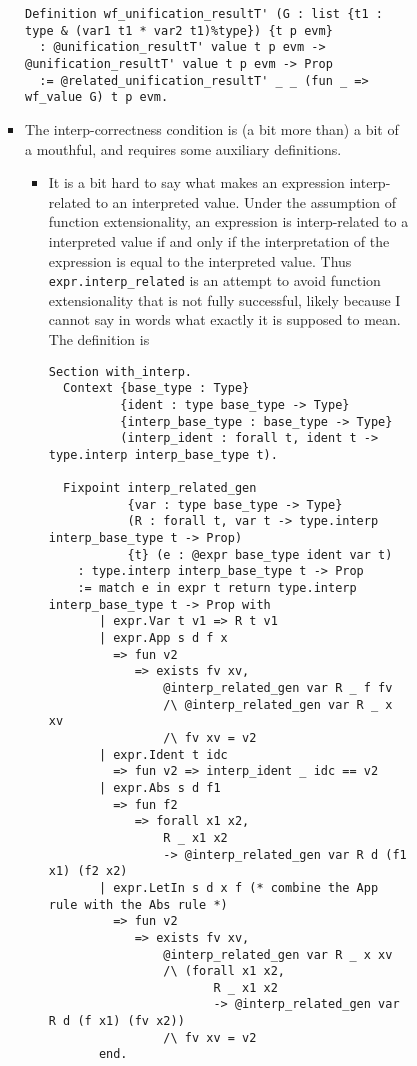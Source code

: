 \documentclass[
]{article}
\begin{document}
\begin{itemize}
\begin{itemize}
\begin{itemize}
\begin{itemize}
\begin{itemize}
\begin{verbatim}
Definition wf_unification_resultT' (G : list {t1 : type & (var1 t1 * var2 t1)%type}) {t p evm}
  : @unification_resultT' value t p evm -> @unification_resultT' value t p evm -> Prop
  := @related_unification_resultT' _ _ (fun _ => wf_value G) t p evm.
\end{verbatim}
        \item
          The interp-correctness condition is (a bit more than) a bit of
          a mouthful, and requires some auxiliary definitions.

          \begin{itemize}
          \item
            It is a bit hard to say what makes an expression
            interp-related to an interpreted value. Under the assumption
            of function extensionality, an expression is interp-related
            to a interpreted value if and only if the interpretation of
            the expression is equal to the interpreted value. Thus
            \texttt{expr.interp\_related} is an attempt to avoid
            function extensionality that is not fully successful, likely
            because I cannot say in words what exactly it is supposed to
            mean. The definition is

\begin{verbatim}
Section with_interp.
  Context {base_type : Type}
          {ident : type base_type -> Type}
          {interp_base_type : base_type -> Type}
          (interp_ident : forall t, ident t -> type.interp interp_base_type t).

  Fixpoint interp_related_gen
           {var : type base_type -> Type}
           (R : forall t, var t -> type.interp interp_base_type t -> Prop)
           {t} (e : @expr base_type ident var t)
    : type.interp interp_base_type t -> Prop
    := match e in expr t return type.interp interp_base_type t -> Prop with
       | expr.Var t v1 => R t v1
       | expr.App s d f x
         => fun v2
            => exists fv xv,
                @interp_related_gen var R _ f fv
                /\ @interp_related_gen var R _ x xv
                /\ fv xv = v2
       | expr.Ident t idc
         => fun v2 => interp_ident _ idc == v2
       | expr.Abs s d f1
         => fun f2
            => forall x1 x2,
                R _ x1 x2
                -> @interp_related_gen var R d (f1 x1) (f2 x2)
       | expr.LetIn s d x f (* combine the App rule with the Abs rule *)
         => fun v2
            => exists fv xv,
                @interp_related_gen var R _ x xv
                /\ (forall x1 x2,
                       R _ x1 x2
                       -> @interp_related_gen var R d (f x1) (fv x2))
                /\ fv xv = v2
       end.


\end{verbatim}
\end{itemize}
\end{itemize}
\end{itemize}
\end{itemize}
\end{itemize}
\end{itemize}
\end{document}
